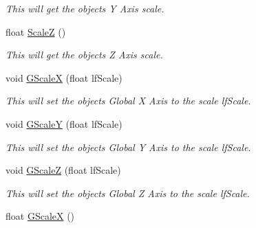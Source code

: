 \begin{DoxyCompactItemize}
\begin{DoxyCompactList}\small\item\em This will get the objects Y Axis scale. \end{DoxyCompactList}\item 
\hypertarget{classc_matrix4_a42eda4ea2a974f5b13591f083e45d14c}{
float \hyperlink{classc_matrix4_a42eda4ea2a974f5b13591f083e45d14c}{ScaleZ} ()}
\label{classc_matrix4_a42eda4ea2a974f5b13591f083e45d14c}

\begin{DoxyCompactList}\small\item\em This will get the objects Z Axis scale. \end{DoxyCompactList}\item 
\hypertarget{classc_matrix4_ac69f9e4ee1118580de8972e2b66da868}{
void \hyperlink{classc_matrix4_ac69f9e4ee1118580de8972e2b66da868}{GScaleX} (float lfScale)}
\label{classc_matrix4_ac69f9e4ee1118580de8972e2b66da868}

\begin{DoxyCompactList}\small\item\em This will set the objects Global X Axis to the scale lfScale. \end{DoxyCompactList}\item 
\hypertarget{classc_matrix4_af1cf539a6f87767feb23251fad0289c8}{
void \hyperlink{classc_matrix4_af1cf539a6f87767feb23251fad0289c8}{GScaleY} (float lfScale)}
\label{classc_matrix4_af1cf539a6f87767feb23251fad0289c8}

\begin{DoxyCompactList}\small\item\em This will set the objects Global Y Axis to the scale lfScale. \end{DoxyCompactList}\item 
\hypertarget{classc_matrix4_aa8cf98447437599b613eb491f510ee7d}{
void \hyperlink{classc_matrix4_aa8cf98447437599b613eb491f510ee7d}{GScaleZ} (float lfScale)}
\label{classc_matrix4_aa8cf98447437599b613eb491f510ee7d}

\begin{DoxyCompactList}\small\item\em This will set the objects Global Z Axis to the scale lfScale. \end{DoxyCompactList}\item 
\hypertarget{classc_matrix4_a74c4a8cd7539f99ba2d5c8c98f757748}{
float \hyperlink{classc_matrix4_a74c4a8cd7539f99ba2d5c8c98f757748}{GScaleX} ()}
\label{classc_matrix4_a74c4a8cd7539f99ba2d5c8c98f757748}


\end{DoxyCompactItemize}
